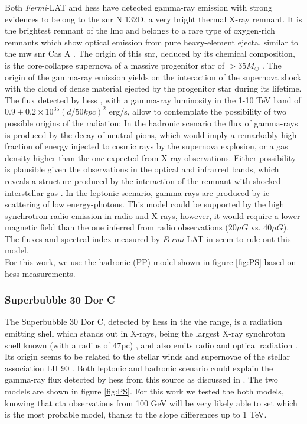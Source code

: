 \documentclass[main.tex]{subfiles}
\begin{document}
Both \textit{Fermi}-LAT and \gls{hess} have detected gamma-ray emission with strong evidences to belong to the \gls{snr} N 132D, a very bright thermal X-ray remnant. It is the brightest remnant of the \gls{lmc} and belongs to a rare type of oxygen-rich remnants which show optical emission from pure heavy-element ejecta, similar to the \gls{mw} \gls{snr} Cas A \cite{2007N132D}. The origin of this \gls{snr}, deduced by its chemical composition, is the core-collapse supernova of a massive progenitor star of $> 35 M_{\odot}$ \cite{2007N132D}. The origin of the gamma-ray emission yields on the interaction of the supernova shock with the cloud of dense material ejected by the progenitor star during its lifetime. The flux detected by \gls{hess} \cite{2015HESSTeVLMC}, with a gamma-ray luminosity in the 1-10 TeV band of $0.9 \pm 0.2 \times 10^{35}(d/50kpc)^2$ erg/s, allow to contemplate the possibility of two possible origins of the radiation: In the hadronic scenario the flux of gamma-rays is produced by the decay of neutral-pions, which would imply a remarkably high fraction of energy injected to cosmic rays by the supernova explosion, or a gas density higher than the one expected from X-ray observations. Either possibility is plausible given the observations in the optical and infrarred bands, which reveals a structure produced by the interaction of the remnant with shocked interstellar gas \cite{2006shockn132D}. In the leptonic scenario, gamma rays are produced by \gls{ic} scattering of low energy-photons. This model could be supported by the high synchrotron radio emission in radio and X-rays, however, it would require a lower magnetic field than the one inferred from radio observations ($20 \mu G$ vs. $40\mu G$). The fluxes and spectral index measured by \textit{Fermi}-LAT in \cite{2016LMCFermiLAT} seem to rule out this model.\\
For this work, we use the hadronic (PP) model shown in figure \ref{fig:PS} based on \gls{hess} measurements.


\subsubsection{Superbubble 30 Dor C}

The Superbubble 30 Dor C, detected by \gls{hess} in the \gls{vhe} range, is a radiation emitting shell which stands out in X-rays, being the largest X-ray synchroton shell known (with a radius of 47pc) \cite{200430dorcxrays}, and also emits radio and optical radiation \cite{1985SNRsintheLMC30dorc}. Its origin seems to be related to the stellar winds and supernovae of the stellar association LH 90 \cite{198430dorLH90}. Both leptonic and hadronic scenario could explain the gamma-ray flux detected by \gls{hess} from this source as discussed in \cite{2015HESSTeVLMC}. The two models are shown in figure \ref{fig:PS}. For this work we tested the both models, knowing that \gls{cta} observations from 100 GeV will be very likely able to set which is the most probable model, thanks to the slope differences up to 1 TeV.
\end{document}

